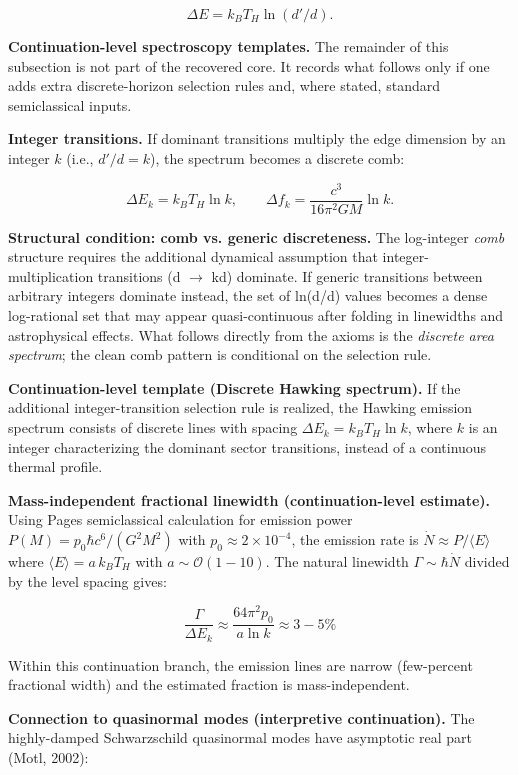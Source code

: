 \[
\Delta E = k_B T_H \ln(d'/d).
\]

\textbf{Continuation-level spectroscopy templates.} The remainder of this subsection is not part of the recovered core. It records what follows only if one adds extra discrete-horizon selection rules and, where stated, standard semiclassical inputs.

\textbf{Integer transitions.} If dominant transitions multiply the edge dimension by an integer \(k\) (i.e., \(d'/d = k\)), the spectrum becomes a discrete comb:

\[
\Delta E_k = k_B T_H \ln k, \qquad
\Delta f_k = \frac{c^3}{16\pi^2 G M} \ln k.
\]

\textbf{Structural condition: comb vs. generic discreteness.} The log-integer \emph{comb} structure requires the additional dynamical assumption that integer-multiplication transitions (d \ensuremath{\to} kd) dominate. If generic transitions between arbitrary integers dominate instead, the set of ln(d\textquotesingle/d) values becomes a dense log-rational set that may appear quasi-continuous after folding in linewidths and astrophysical effects. What follows directly from the axioms is the \emph{discrete area spectrum}; the clean comb pattern is conditional on the selection rule.

\textbf{Continuation-level template (Discrete Hawking spectrum).} If the additional integer-transition selection rule is realized, the Hawking emission spectrum consists of discrete lines with spacing \(\Delta E_k = k_B T_H \ln k\), where \(k\) is an integer characterizing the dominant sector transitions, instead of a continuous thermal profile.

\textbf{Mass-independent fractional linewidth (continuation-level estimate).} Using Page\textquotesingle s semiclassical calculation for emission power \(P(M) = p_0 \hbar c^6 / (G^2 M^2)\) with \(p_0 \approx 2 \times 10^{-4}\), the emission rate is \(\dot{N} \approx P /
\langle E \rangle\) where \(\langle E \rangle = a \, k_B T_H\) with \(a \sim
\mathcal{O}(1-10)\). The natural linewidth \(\Gamma \sim \hbar \dot{N}\) divided by the level spacing gives:

\[
\frac{\Gamma}{\Delta E_k} \approx \frac{64\pi^2 p_0}{a \ln k} \approx 3-5\%
\]

Within this continuation branch, the emission lines are narrow (few-percent fractional width) and the estimated fraction is mass-independent.

\textbf{Connection to quasinormal modes (interpretive continuation).} The highly-damped Schwarzschild quasinormal modes have asymptotic real part (Motl, 2002):

